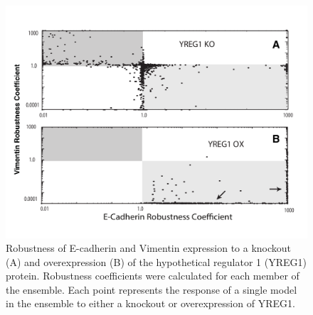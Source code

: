 \begin{figure}
\includegraphics [width=1.0\linewidth] {./figs/Fig-8-Supplemental-YREG1.pdf}
\caption{Robustness of E-cadherin and Vimentin expression to a knockout (A) and overexpression (B) of the hypothetical regulator 1 (YREG1) protein.
Robustness coefficients were calculated for each member of the ensemble. Each point represents the response of a single model in the ensemble to either a knockout or
overexpression of YREG1.}\label{fig:S8}
\end{figure}

